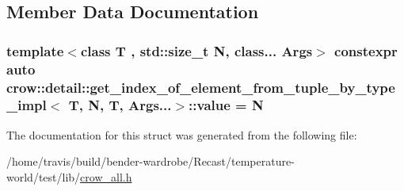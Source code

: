 \subsection{Member Data Documentation}
\hypertarget{structcrow_1_1detail_1_1get__index__of__element__from__tuple__by__type__impl_3_01_t_00_01_n_00_01_t_00_01_args_8_8_8_4_a5c554a57f523634de6a5d749152753e8}{
\subsubsection[{value}]{\setlength{\rightskip}{0pt plus 5cm}template$<$class T , std\-::size\-\_\-t N, class... Args$>$ constexpr auto {\bf crow\-::detail\-::get\-\_\-index\-\_\-of\-\_\-element\-\_\-from\-\_\-tuple\-\_\-by\-\_\-type\-\_\-impl}$<$ T, N, T, Args...$>$\-::value = N\hspace{0.3cm}{\ttfamily [static]}}}\label{structcrow_1_1detail_1_1get__index__of__element__from__tuple__by__type__impl_3_01_t_00_01_n_00_01_t_00_01_args_8_8_8_4_a5c554a57f523634de6a5d749152753e8}


The documentation for this struct was generated from the following file\-:\begin{DoxyCompactItemize}
\item 
/home/travis/build/bender-\/wardrobe/\-Recast/temperature-\/world/test/lib/\hyperlink{crow__all_8h}{crow\-\_\-all.\-h}\end{DoxyCompactItemize}
